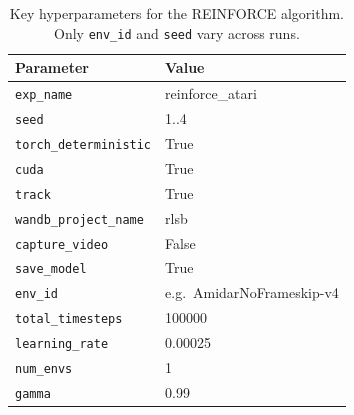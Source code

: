 \begin{table}
	\caption{Key hyperparameters for the REINFORCE algorithm. Only \texttt{env\_id} and \texttt{seed} vary across runs.}
	\label{tab:reinforce_hyperparams}
	\centering
	\begin{tabular}{ll}
		\toprule
		\textbf{Parameter} & \textbf{Value} \\
		\midrule
		\texttt{exp\_name}            & reinforce\_atari \\
		\texttt{seed}                 & 1..4 \\
		\texttt{torch\_deterministic} & True \\
		\texttt{cuda}                 & True \\
		\texttt{track}                & True \\
		\texttt{wandb\_project\_name} & rlsb \\
		\texttt{capture\_video}       & False \\
		\texttt{save\_model}          & True \\
		\texttt{env\_id}              & e.g.\ AmidarNoFrameskip-v4 \\
		\texttt{total\_timesteps}     & 100000 \\
		\texttt{learning\_rate}       & 0.00025 \\
		\texttt{num\_envs}            & 1 \\
		\texttt{gamma}                & 0.99 \\
		\bottomrule
	\end{tabular}
\end{table}

